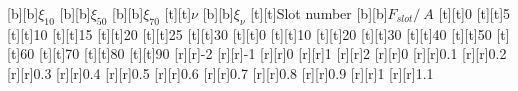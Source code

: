 %    
%
%
\begin{psfrags}%
\psfragscanon%
%
[b][b]{{\tiny $\xi_{10}$}}%
[b][b]{{\tiny $\xi_{50}$}}%
[b][b]{{\tiny $\xi_{70}$}}%
[t][t]{{\tiny $\nu$}}%
[b][b]{{\tiny $\xi_{\nu}$}}%
[t][t]{{\tiny Slot number}}%
[b][b]{{\tiny $F_{slot}/\SI{}{A}$}}%
%
[t][t]{{\tiny 0}}%
[t][t]{{\tiny 5}}%
[t][t]{{\tiny 10}}%
[t][t]{{\tiny 15}}%
[t][t]{{\tiny 20}}%
[t][t]{{\tiny 25}}%
[t][t]{{\tiny 30}}%
[t][t]{{\tiny 0}}%
[t][t]{{\tiny 10}}%
[t][t]{{\tiny 20}}%
[t][t]{{\tiny 30}}%
[t][t]{{\tiny 40}}%
[t][t]{{\tiny 50}}%
[t][t]{{\tiny 60}}%
[t][t]{{\tiny 70}}%
[t][t]{{\tiny 80}}%
[t][t]{{\tiny 90}}%
%
[r][r]{{\tiny -2}}%
[r][r]{{\tiny -1}}%
[r][r]{{\tiny 0}}%
[r][r]{{\tiny 1}}%
[r][r]{{\tiny 2}}%
[r][r]{{\tiny 0}}%
[r][r]{{\tiny 0.1}}%
[r][r]{{\tiny 0.2}}%
[r][r]{{\tiny 0.3}}%
[r][r]{{\tiny 0.4}}%
[r][r]{{\tiny 0.5}}%
[r][r]{{\tiny 0.6}}%
[r][r]{{\tiny 0.7}}%
[r][r]{{\tiny 0.8}}%
[r][r]{{\tiny 0.9}}%
[r][r]{{\tiny 1}}%
[r][r]{{\tiny 1.1}}%
%

%
\end{psfrags}%
%
